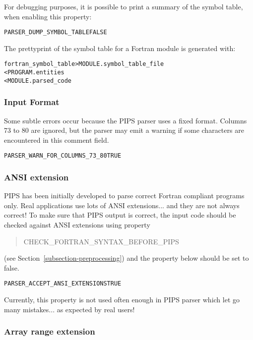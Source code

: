 \documentclass[a4paper]{report}
\newenvironment{PipsProp}{\begin{alltt}}{\end{alltt}}
\newenvironment{PipsMake}{\begin{alltt}}{\end{alltt}}
\begin{document}
For debugging purposes, it is possible to print a summary of the symbol
table, when enabling this property:
\begin{PipsProp}
PARSER_DUMP_SYMBOL_TABLE FALSE
\end{PipsProp}
The prettyprint of the symbol table for a Fortran module is generated with:
\begin{PipsMake}
fortran_symbol_table        > MODULE.symbol_table_file
    < PROGRAM.entities
    < MODULE.parsed_code
\end{PipsMake}

\subsubsection*{Input Format}

Some subtle errors occur because the PIPS parser uses a fixed
format. Columns 73 to 80 are ignored, but the parser may emit a warning
if some characters are encountered in this comment field.

\begin{PipsProp}
PARSER_WARN_FOR_COLUMNS_73_80   TRUE
\end{PipsProp}

\subsubsection*{ANSI extension}

PIPS has been initially developed to parse correct Fortran compliant
programs only. Real applications use lots of ANSI extensions... and they
are not always correct! To make sure that PIPS output is correct, the
input code should be checked against ANSI extensions using property
\begin{quote}
CHECK\_FORTRAN\_SYNTAX\_BEFORE\_PIPS
\end{quote}
(see Section~\ref{subsection-preprocessing}) and the property below should
be set to false.

\begin{PipsProp}
PARSER_ACCEPT_ANSI_EXTENSIONS TRUE
\end{PipsProp}

Currently, this property is not used often enough in PIPS parser which let
go many mistakes... as expected by real users!

\subsubsection*{Array range extension}
\end{document}
